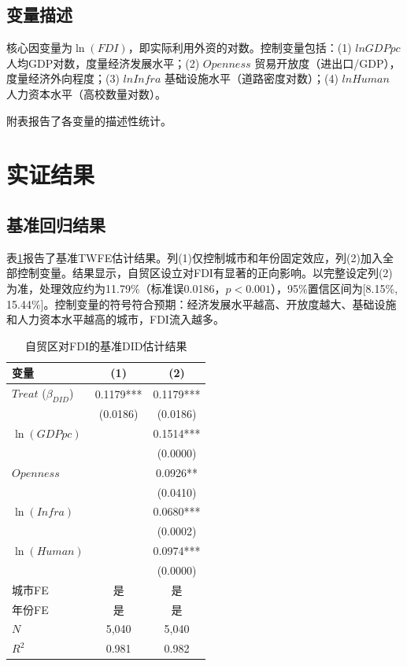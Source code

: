 \documentclass[12pt,a4paper]{article}
\begin{document}
\subsection{变量描述}

核心因变量为$\ln(FDI)$，即实际利用外资的对数。控制变量包括：(1) $lnGDPpc$ 人均GDP对数，度量经济发展水平；(2) $Openness$ 贸易开放度（进出口/GDP），度量经济外向程度；(3) $lnInfra$ 基础设施水平（道路密度对数）；(4) $lnHuman$ 人力资本水平（高校数量对数）。

附表报告了各变量的描述性统计。


\section{实证结果}
\label{sec:results}

\subsection{基准回归结果}

表\ref{tab:baseline}报告了基准TWFE估计结果。列(1)仅控制城市和年份固定效应，列(2)加入全部控制变量。结果显示，自贸区设立对FDI有显著的正向影响。以完整设定列(2)为准，处理效应约为11.79\%（标准误0.0186，$p<0.001$），95\%置信区间为[8.15\%, 15.44\%]。控制变量的符号符合预期：经济发展水平越高、开放度越大、基础设施和人力资本水平越高的城市，FDI流入越多。

\begin{table}[H]
\centering
\caption{自贸区对FDI的基准DID估计结果}
\label{tab:baseline}
\begin{tabular}{lcc}
\toprule
\textbf{变量} & \textbf{(1)} & \textbf{(2)} \\
\midrule
$Treat$ ($\beta_{DID}$) & 0.1179*** & 0.1179*** \\
 & (0.0186) & (0.0186) \\
$\ln(GDPpc)$ & & 0.1514*** \\
 & & (0.0000) \\
$Openness$ & & 0.0926** \\
 & & (0.0410) \\
$\ln(Infra)$ & & 0.0680*** \\
 & & (0.0002) \\
$\ln(Human)$ & & 0.0974*** \\
 & & (0.0000) \\
\midrule
城市FE & 是 & 是 \\
年份FE & 是 & 是 \\
\midrule
$N$ & 5,040 & 5,040 \\
$R^2$ & 0.981 & 0.982 \\
\bottomrule
\end{tabular}
\end{table}
\end{document}
